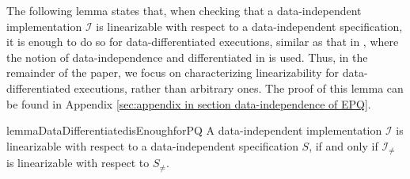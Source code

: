 The following lemma states that, when checking that a data-independent implementation $\mathcal{I}$ is linearizable with respect to a data-independent specification, it is enough to do so for data-differentiated executions, similar as that in \cite{Abdulla:2013}, where the notion of data-independence and differentiated in \cite{Wolper:1986} is used. Thus, in the remainder of the paper, we focus on characterizing linearizability for data-differentiated executions, rather than arbitrary ones. The proof of this lemma can be found in Appendix \ref{sec:appendix in section data-independence of EPQ}.

\begin{restatable}{lemma}{DataDifferentiatedisEnoughforPQ}
\label{lemma:data differentiated is enough for PQ}
A data-independent implementation $\mathcal{I}$ is linearizable with respect to a data-independent specification $S$, if and only if $\mathcal{I}_{\neq}$ is linearizable with respect to $S_{\neq}$.
\end{restatable}

